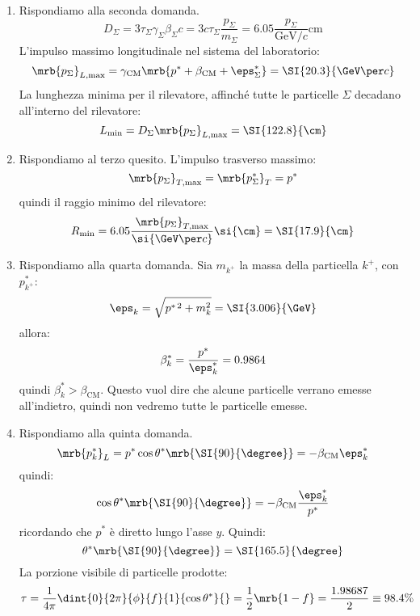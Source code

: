 \begin{example}
\begin{enumerate}
		\item Rispondiamo alla seconda domanda.
		      \[
			      D _{\Sigma} = 3 \tau _{\Sigma} \gamma _{\Sigma} \beta _{\Sigma} c = 3 c
			      \tau _{\Sigma} \frac{p _{\Sigma}}{m _{\Sigma}} =
			      6.05 \frac{p _{\Sigma}}{\si{\GeV \per c}} \si{\cm}
		      \]
		      L'impulso massimo longitudinale nel sistema del laboratorio:
		      \[
			      \mrb{p _{\Sigma}} _{L, \text{max}} = \gamma _\text{CM} \mrb{p ^{\ast} +
				      \beta _\text{CM} + \eps _{\Sigma}^{\ast}} = \SI{20.3}{\GeV \per c}
		      \]
		      La lunghezza minima per il rilevatore, affinché tutte le particelle
		      $\Sigma$ decadano all'interno del rilevatore:
		      \[
			      L _\text{min} = D _{\Sigma} \mrb{p _{\Sigma}}_{L, \text{max}} =
			      \SI{122.8}{\cm}
		      \]

		\item Rispondiamo al terzo quesito. L'impulso trasverso massimo:
		      \[
			      \mrb{p _{\Sigma}}_{T, \text{max}} = \mrb{p _{\Sigma}^{\ast}}_{T} =
			      p^\ast
		      \]
		      quindi il raggio minimo del rilevatore:
		      \[
			      R _\text{min} = 6.05 \frac{\mrb{p _{\Sigma}}_{T, \text{max}}}{\si{\GeV
					      \per c}} \si{\cm} = \SI{17.9}{\cm}
		      \]

		\item Rispondiamo alla quarta domanda. Sia $m _{k^+}$ la massa della
		      particella
		      $k^+$, con $p ^{\ast} _{k^+}$:
		      \[
			      \eps _{k} = \sqrt{p ^{\ast\, 2} + m _{k}^{2}} = \SI{3.006}{\GeV}
		      \]
		      allora:
		      \[
			      \beta _{k}^{\ast} = \frac{p ^{\ast}}{\eps _{k}^{\ast}} = 0.9864
		      \]
		      quindi $\beta _{k}^{\ast} > \beta _\text{CM}$. Questo vuol dire che
		      alcune particelle verrano emesse all'indietro, quindi non vedremo tutte
		      le particelle emesse.

		\item Rispondiamo alla quinta domanda.
		      \[
			      \mrb{p _{k}^{\ast}}_{L} = p ^{\ast} \cos \theta^\ast \mrb{\SI{90}{\degree}}
			      = - \beta _\text{CM} \eps _{k}^{\ast}
		      \]
		      quindi:
		      \[
			      \cos \theta^\ast \mrb{\SI{90}{\degree}} = - \beta _\text{CM} \frac{\eps
				      _{k}^{\ast}}{p ^{\ast}}
		      \]
		      ricordando che $p^\ast$ è diretto lungo l'asse $y$.
		      Quindi:
		      \[
			      \theta ^{\ast} \mrb{\SI{90}{\degree}} = \SI{165.5}{\degree}
		      \]
		      La porzione visibile di particelle prodotte:
		      \[
			      \tau = \frac{1}{4 \pi} \dint{0}{2 \pi}{\phi}{f}{1}{\cos \theta^\ast}{} = %
			      \frac{1}{2} \mrb{1 - f} = \frac{1.98687}{2} \equiv 98.4 \%
		      \]
	\end{enumerate}
\end{example}
